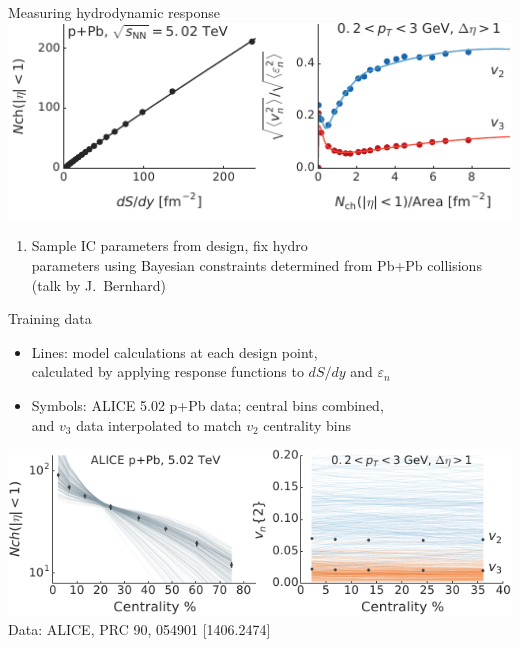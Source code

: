 \documentclass[aspectratio=43]{beamer}
\theoremstyle{definition}
\begin{document}
\begin{frame}[t]{Measuring hydrodynamic response}
  \vspace{.5 cm}
  \includegraphics[width=\textwidth]{response}\\
  \begin{enumerate}
    \item Sample IC parameters from design, fix hydro \\
      parameters using Bayesian constraints determined from Pb+Pb collisions (talk by J.\ Bernhard)
  \end{enumerate}
\end{frame}

\begin{frame}[b]{Training data}
  \bigskip
  \begin{itemize}
    \item Lines: model calculations at each design point, \\
      calculated by applying response functions to $dS/dy$ and $\varepsilon_n$ \\[1ex]
    \item Symbols: ALICE 5.02 p+Pb data; central bins combined,\\
      and $v_3$ data interpolated to match $v_2$ centrality bins
  \end{itemize}
  \bigskip
  \includegraphics[width=\textwidth]{observables_design} \\[1ex]
  \centering
  {\scriptsize Data: ALICE, PRC 90, 054901 [1406.2474]}
  \vspace{1.2 cm}
\end{frame}
\end{document}
